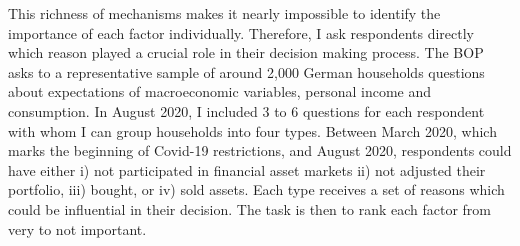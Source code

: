 \documentclass[ProjectABM]{subfiles}
\begin{document}










This richness of mechanisms makes it nearly impossible to identify the importance of each factor individually. Therefore, I ask respondents directly which reason played a crucial role in their decision making process. The BOP asks to a representative sample of around 2,000 German households questions about expectations of macroeconomic variables, personal income and consumption. In August 2020, I included 3 to 6 questions for each respondent with whom I can group households into four types. Between March 2020, which marks the beginning of Covid-19 restrictions, and August 2020, respondents could have either i) not participated in financial asset markets ii) not adjusted their portfolio, iii) bought, or iv) sold assets. Each type receives a set of reasons which could be influential in their decision. The task is then to rank each factor from very to not important.
\end{document}
